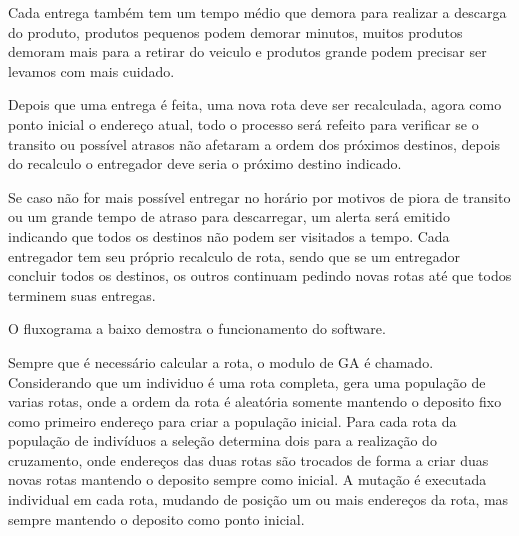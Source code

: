Cada entrega também tem um tempo médio que demora para realizar a descarga do produto, produtos pequenos podem demorar minutos, muitos produtos demoram mais para a retirar do veiculo e produtos grande podem precisar ser levamos com mais cuidado.

Depois que uma entrega é feita, uma nova rota deve ser recalculada, agora como ponto inicial o endereço atual, todo o processo será refeito para verificar se o transito ou possível atrasos não afetaram a ordem dos próximos destinos, depois do recalculo o entregador deve seria o próximo destino indicado.

Se caso não for mais possível entregar no horário por motivos de piora de transito ou um grande tempo de atraso para descarregar, um alerta será emitido indicando que todos os destinos não podem ser visitados a tempo.
Cada entregador tem seu próprio recalculo de rota, sendo que se um entregador concluir todos os destinos, os outros continuam pedindo novas rotas até que todos terminem suas entregas.

O fluxograma a baixo demostra o funcionamento do software.

\begin{center}
    \label{fig:FluxoSoftware}
\end{center}

Sempre que é necessário calcular a rota, o modulo de GA é chamado. Considerando que um individuo é uma rota completa, gera uma população de varias rotas, onde a ordem da rota é aleatória somente mantendo o deposito fixo como primeiro endereço para criar a população inicial.
Para cada rota da população de indivíduos a seleção determina dois para a realização do cruzamento, onde endereços das duas rotas são trocados de forma a criar duas novas rotas mantendo o deposito sempre como inicial. A mutação é executada individual em cada rota, mudando de posição um ou mais endereços da rota, mas sempre 
mantendo o deposito como ponto inicial.

